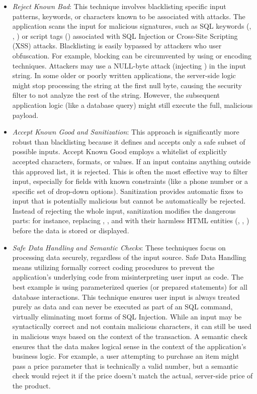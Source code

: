 \begin{itemize}
    \item \textit{Reject Known Bad}: This technique involves blacklisting specific input patterns, keywords, or characters known to be associated with attacks. The application scans the input for malicious signatures, such as SQL keywords (, , ) or script tags () associated with SQL Injection or Cross-Site Scripting (XSS) attacks. Blacklisting is easily bypassed by attackers who user obfuscation. For example, blocking  can be circumvented by using  or encoding techniques. Attackers may use a NULL-byte attack (injecting ) in the input string. In some older or poorly written applications, the server-side logic might stop processing the string at the first null byte, causing the security filter to not analyze the rest of the string. However, the subsequent application logic (like a database query) might still execute the full, malicious payload.
    \item \textit{Accept Known Good and Sanitization}: This approach is significantly more robust than blacklisting because it defines and accepts only a safe subset of possible inputs. Accept Known Good employs a whitelist of explicitly accepted characters, formats, or values. If an input contains anything outside this approved list, it is rejected. This is often the most effective way to filter input, especially for fields with known constraints (like a phone number or a specific set of drop-down options). Sanitization provides automatic fixes to input that is potentially malicious but cannot be automatically be rejected. Instead of rejecting the whole input, sanitization modifies the dangerous parts: for instance, replacing \NewTexttt{<}, \NewTexttt{>}, and \NewTexttt{\&} with their harmless HTML entities (, , ) before the data is stored or displayed.
    \item \textit{Safe Data Handling and Semantic Checks}: These techniques focus on processing data securely, regardless of the input source. Safe Data Handling means utilizing formally correct coding procedures to prevent the application's underlying code from misinterpreting user input as code. The best example is using parameterized queries (or prepared statements) for all database interactions. This technique ensures user input is always treated purely as data and can never be executed as part of an SQL command, virtually eliminating most forms of SQL Injection. While an input may be syntactically correct and not contain malicious characters, it can still be used in malicious ways based on the context of the transaction. A semantic check ensures that the data makes logical sense in the context of the application's business logic. For example, a user attempting to purchase an item might pass a price parameter that is technically a valid number, but a semantic check would reject it if the price doesn't match the actual, server-side price of the product.
    

\end{itemize}
